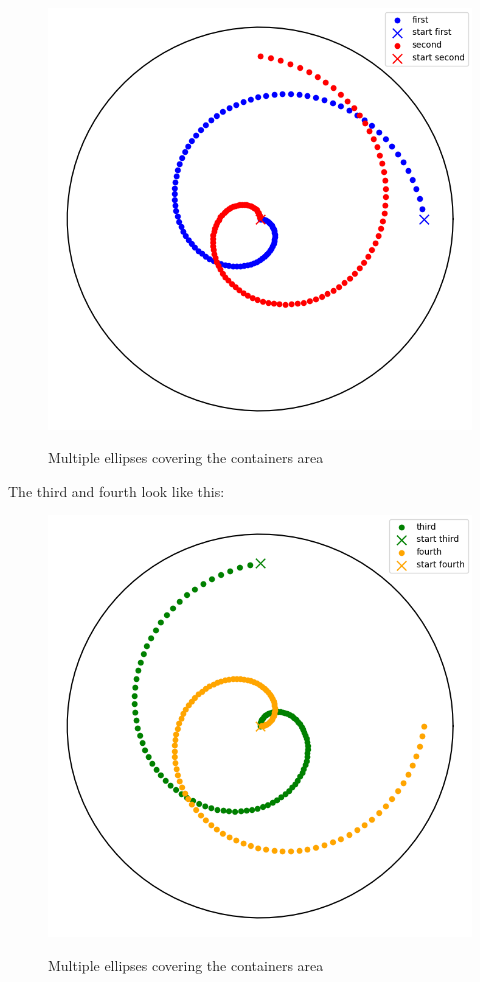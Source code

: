 \begin{figure}[H]
    \includegraphics[scale=0.35]{Graphics/motions/whirlstorm2.png}
    \centering
    \label{fig:foldingMotion1}
    \caption{Multiple ellipses covering the containers area}
\end{figure}
The third and fourth look like this:

\begin{figure}[H]
    \includegraphics[scale=0.35]{Graphics/motions/whirlstorm3.png}
    \centering
    \label{fig:foldingMotion1}
    \caption{Multiple ellipses covering the containers area}
\end{figure}

